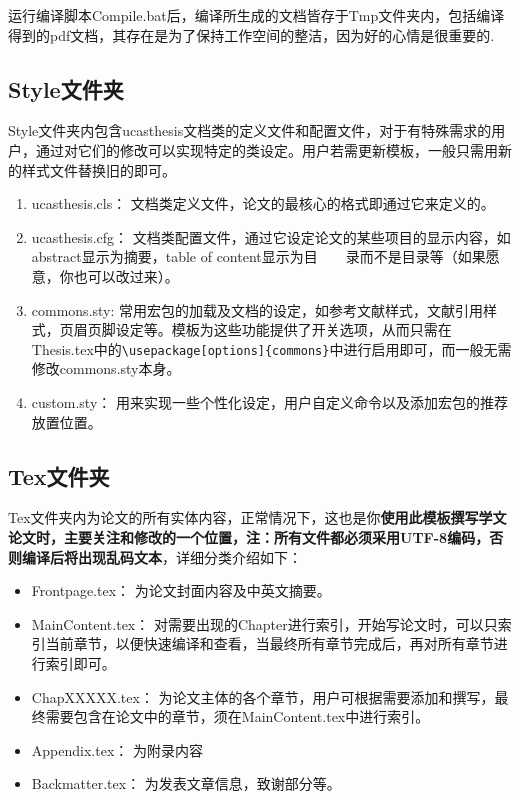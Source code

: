 运行编译脚本Compile.bat后，编译所生成的文档皆存于Tmp文件夹内，包括编译得到的pdf文档，其存在是为了保持工作空间的整洁，因为好的心情是很重要的.

\subsection{Style文件夹}

Style文件夹内包含ucasthesis文档类的定义文件和配置文件，对于有特殊需求的用户，通过对它们的修改可以实现特定的类设定。用户若需更新模板，一般只需用新的样式文件替换旧的即可。

\begin{enumerate}
  \item ucasthesis.cls： 文档类定义文件，论文的最核心的格式即通过它来定义的。
  \item ucasthesis.cfg： 文档类配置文件，通过它设定论文的某些项目的显示内容，如abstract显示为摘要，table of content显示为目~~~~录而不是目录等（如果愿意，你也可以改过来）。
  \item commons.sty: 常用宏包的加载及文档的设定，如参考文献样式，文献引用样式，页眉页脚设定等。模板为这些功能提供了开关选项，从而只需在Thesis.tex中的\verb+\usepackage[options]{commons}+中进行启用即可，而一般无需修改commons.sty本身。
  \item custom.sty： 用来实现一些个性化设定，用户自定义命令以及添加宏包的推荐放置位置。
\end{enumerate}

\subsection{Tex文件夹}

Tex文件夹内为论文的所有实体内容，正常情况下，这也是你\textbf{使用此模板撰写学文论文时，主要关注和修改的一个位置，注：所有文件都必须采用UTF-8编码，否则编译后将出现乱码文本}，详细分类介绍如下：

\begin{itemize}
  \item Frontpage.tex： 为论文封面内容及中英文摘要。
  \item Main\textunderscore Content.tex： 对需要出现的Chapter进行索引，开始写论文时，可以只索引当前章节，以便快速编译和查看，当最终所有章节完成后，再对所有章节进行索引即可。
  \item Chap\textunderscore XXXXX.tex： 为论文主体的各个章节，用户可根据需要添加和撰写，最终需要包含在论文中的章节，须在Main\textunderscore Content.tex中进行索引。
  \item Appendix.tex： 为附录内容
  \item Backmatter.tex： 为发表文章信息，致谢部分等。
\end{itemize}

